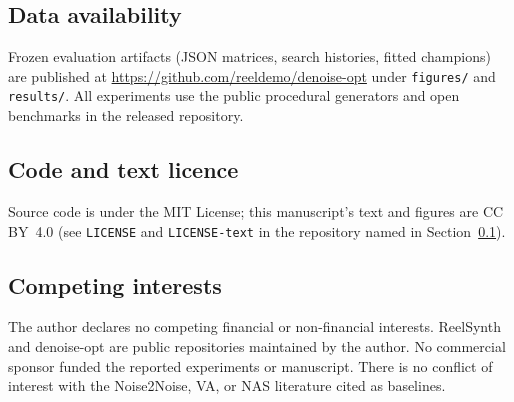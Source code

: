 \subsection{Data availability}
\label{sec:data-availability}
Frozen evaluation artifacts (JSON matrices, search histories, fitted champions)
are published at \url{https://github.com/reeldemo/denoise-opt}
under \texttt{figures/} and \texttt{results/}.
All experiments use the public procedural generators and open benchmarks in the released repository.

\subsection{Code and text licence}
\label{sec:code-licence}
Source code is under the MIT License; this manuscript's text and figures are CC BY~4.0 (see \texttt{LICENSE} and \texttt{LICENSE-text} in the repository named in Section~\ref{sec:data-availability}).

\subsection{Competing interests}
\label{sec:competing}
The author declares no competing financial or non-financial interests.
ReelSynth and denoise-opt are public repositories maintained by the author. No commercial sponsor funded the reported experiments or manuscript.
There is no conflict of interest with the Noise2Noise, VA, or NAS literature cited as baselines.
